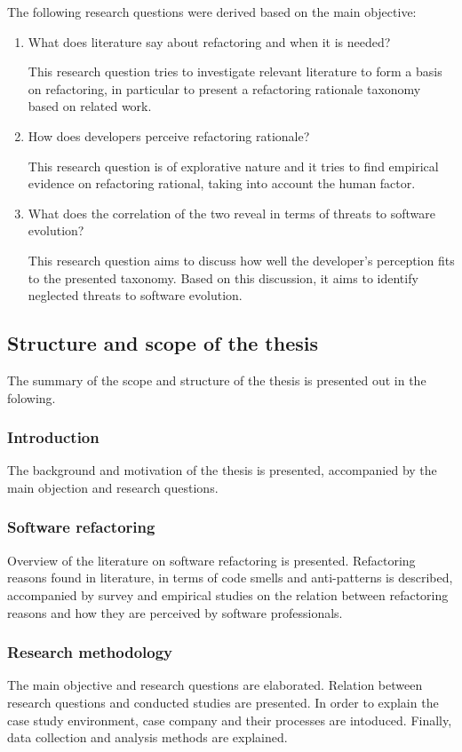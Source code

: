 The following research questions were derived based on the main objective:

\begin{enumerate}[label=\textbf{RQ\arabic*}]
\item What does literature say about refactoring and when it is needed?

This research question tries to investigate relevant literature to form a basis on refactoring, in particular to present a refactoring rationale taxonomy based on related work.
\item How does developers perceive refactoring rationale?

This research question is of explorative nature and it tries to find empirical evidence on refactoring rational, taking into account the human factor. 
\item What does the correlation of the two reveal in terms of threats to software evolution?

This research question aims to discuss how well the developer's perception fits to the presented taxonomy. Based on this discussion, it aims to identify neglected threats to software evolution.
\end{enumerate}

\subsection{Structure and scope of the thesis} \label{structure}
The summary of the scope and structure of the thesis is presented out in the folowing.

\subsubsection*{Introduction}
The background and motivation of the thesis is presented, accompanied by the main objection and research questions. 

\subsubsection*{Software refactoring}
Overview of the literature on software refactoring is presented. Refactoring reasons found in literature, in terms of code smells and anti-patterns is described, accompanied by survey and empirical studies on the relation between refactoring reasons and how they are perceived by software professionals.


\subsubsection*{Research methodology}
The main objective and research questions are elaborated. Relation between research questions and conducted studies are presented. In order to explain the case study environment, case company and their processes are intoduced. Finally, data collection and analysis methods are explained.

